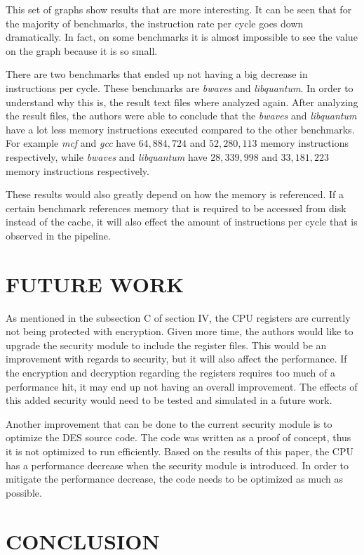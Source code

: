 \documentclass[letterpaper, 10 pt, conference]{ieeeconf}  %
\begin{document}
This set of graphs show results that are more interesting.  It can be seen that for the majority of benchmarks, the instruction rate per cycle goes down dramatically.  In fact, on some benchmarks it is almost impossible to see the value on the graph because it is so small.

There are two benchmarks that ended up not having a big decrease in instructions per cycle.  These benchmarks are \emph{bwaves} and \emph{libquantum}.  In order to understand why this is, the result text files where analyzed again.  After analyzing the result files, the authors were able to conclude that the \emph{bwaves} and \emph{libquantum} have a lot less memory instructions executed compared to the other benchmarks.  For example \emph{mcf} and \emph{gcc} have $64,884,724$ and $52,280,113$ memory instructions respectively, while \emph{bwaves} and \emph{libquantum} have $28,339,998$ and $33,181,223$ memory instructions respectively.

These results would also greatly depend on how the memory is referenced.  If a certain benchmark references memory that is required to be accessed from disk instead of the cache, it will also effect the amount of instructions per cycle that is observed in the pipeline.


\section{FUTURE WORK}

As mentioned in the subsection C of section IV, the CPU registers are currently not being protected with encryption.  Given more time, the authors would like to upgrade the security module to include the register files.  This would be an improvement with regards to security, but it will also affect the performance.  If the encryption and decryption regarding the registers requires too much of a performance hit, it may end up not having an overall improvement.  The  effects of this added security would need to be tested and simulated in a future work.

Another improvement that can be done to the current security module is to optimize the DES source code.  The code was written as a proof of concept, thus it is not optimized to run efficiently.  Based on the results of this paper, the CPU has a performance decrease when the security module is introduced.  In order to mitigate the performance decrease, the code needs to be optimized as much as possible.

\section{CONCLUSION}
\end{document}

